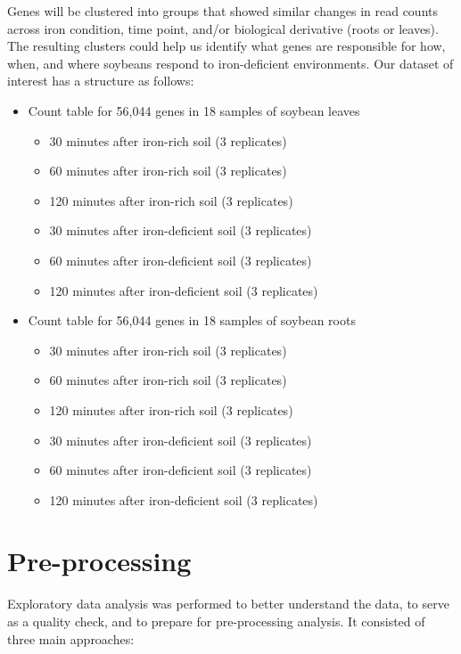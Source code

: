 \documentclass[11pt,a4paper,oldfontcommands,openany]{memoir}
\numberwithin{equation}{section} %
\begin{document}
Genes will be clustered into groups that showed similar changes in read counts across iron condition, time point, and/or biological derivative (roots or leaves). The resulting clusters could help us identify what genes are responsible for how, when, and where soybeans respond to iron-deficient environments. Our dataset of interest has a structure as follows:

\begin{itemize}
  \item Count table for 56,044 genes in 18 samples of soybean leaves
  \begin{itemize}
    \item 30 minutes after iron-rich soil (3 replicates)
    \item 60 minutes after iron-rich soil (3 replicates)
    \item 120 minutes after iron-rich soil (3 replicates)
    \item 30 minutes after iron-deficient soil (3 replicates)
    \item 60 minutes after iron-deficient soil (3 replicates)
    \item 120 minutes after iron-deficient soil (3 replicates)
  \end{itemize}
  \item Count table for 56,044 genes in 18 samples of soybean roots
    \begin{itemize}
    \item 30 minutes after iron-rich soil (3 replicates)
    \item 60 minutes after iron-rich soil (3 replicates)
    \item 120 minutes after iron-rich soil (3 replicates)
    \item 30 minutes after iron-deficient soil (3 replicates)
    \item 60 minutes after iron-deficient soil (3 replicates)
    \item 120 minutes after iron-deficient soil (3 replicates)
  \end{itemize}
\end{itemize}

\section{Pre-processing}

Exploratory data analysis was performed to better understand the data, to serve as a quality check, and to prepare for pre-processing analysis. It consisted of three main approaches:
\end{document}
